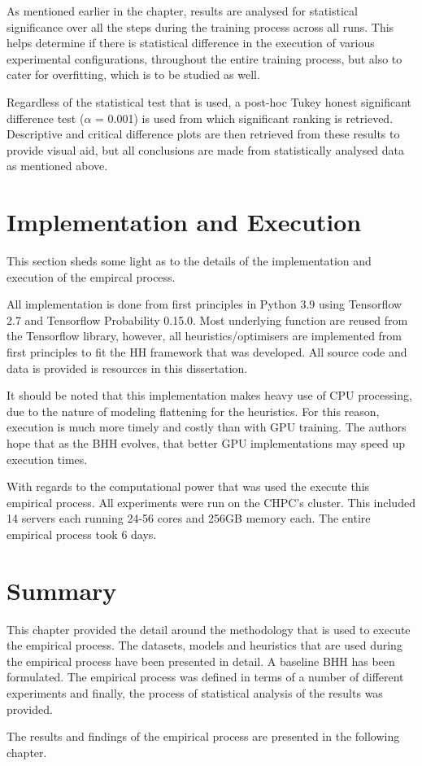As mentioned earlier in the chapter, results are analysed for statistical significance over all the steps during the training process across all runs. This helps determine if there is statistical difference in the execution of various experimental configurations, throughout the entire training process, but also to cater for overfitting, which is to be studied as well.

Regardless of the statistical test that is used, a post-hoc Tukey honest significant difference test ($\alpha$ = 0.001) is used from which significant ranking is retrieved. Descriptive and critical difference plots are then retrieved from these results to provide visual aid, but all conclusions are made from statistically analysed data as mentioned above.

\section{Implementation and Execution}
\label{sec:methodology:implementation}

This section sheds some light as to the details of the implementation and execution of the empircal process.

All implementation is done from first principles in Python 3.9 using Tensorflow 2.7 and Tensorflow Probability 0.15.0. Most underlying function are reused from the Tensorflow library, however, all heuristics/optimisers are implemented from first principles to fit the \ac{HH} framework that was developed. All source code and data is provided is resources in this dissertation.

It should be noted that this implementation makes heavy use of CPU processing, due to the nature of modeling flattening for the heuristics. For this reason, execution is much more timely and costly than with GPU training. The authors hope that as the \ac{BHH} evolves, that better GPU implementations may speed up execution times.

With regards to the computational power that was used the execute this empirical process. All experiments were run on the CHPC's cluster. This included 14 servers each running 24-56 cores and 256GB memory each. The entire empirical process took 6 days.

\section{Summary}
\label{sec:methodology:summary}

This chapter provided the detail around the methodology that is used to execute the empirical process. The datasets, models and heuristics that are used during the empirical process have been presented in detail. A baseline \ac{BHH} has been formulated. The empirical process was defined in terms of a number of different experiments and finally, the process of statistical analysis of the results was provided.

The results and findings of the empirical process are presented in the following chapter.
